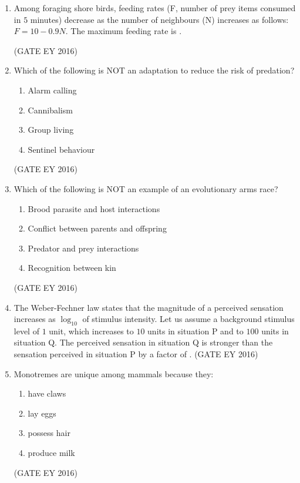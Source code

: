 \documentclass[journal]{IEEEtran}
\begin{document}
\begin{enumerate}[label=Q.\arabic*.]
\item Among foraging shore birds, feeding rates (F, number of prey items consumed in $5$ minutes) decrease as the number of neighbours (N) increases as follows: $F = 10 - 0.9N$. The maximum feeding rate is \underline{\hspace{3cm}}.

\hfill{(GATE EY 2016)}

\item Which of the following is NOT an adaptation to reduce the risk of predation?
\begin{multicols}{2}
\begin{enumerate}
    \item Alarm calling
    \item Cannibalism
    \item Group living
    \item Sentinel behaviour
\end{enumerate}
\end{multicols}
\hfill{(GATE EY 2016)}

\item Which of the following is NOT an example of an evolutionary arms race?
\begin{enumerate}
    \item Brood parasite and host interactions
    \item Conflict between parents and offspring
    \item Predator and prey interactions
    \item Recognition between kin
\end{enumerate}
\hfill{(GATE EY 2016)}

\item The Weber-Fechner law states that the magnitude of a perceived sensation increases as $\log_{10}$ of stimulus intensity. Let us assume a background stimulus level of $1$ unit, which increases to $10$ units in situation P and to $100$ units in situation Q. The perceived sensation in situation Q is stronger than the sensation perceived in situation P by a factor of \underline{\hspace{3cm}}.
\hfill{(GATE EY 2016)}

\item Monotremes are unique among mammals because they:
\begin{multicols}{2}
\begin{enumerate}
    \item have claws
    \item lay eggs
    \item possess hair
    \item produce milk
\end{enumerate}
\end{multicols}
\hfill{(GATE EY 2016)}


\end{enumerate}
\end{document}
